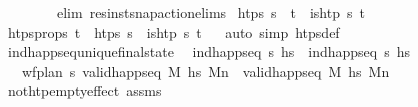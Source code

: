 \begin{isabellebody}
\ \ \ \ \ \ \ \ elim{\isacharbang}{\kern0pt}{\isacharcolon}{\kern0pt}\ res{\isacharunderscore}{\kern0pt}inst{\isacharunderscore}{\kern0pt}snap{\isacharunderscore}{\kern0pt}action{\isachardot}{\kern0pt}elims{\isacharparenright}{\kern0pt}\isanewline
{}\isamarkupfalse%
%
\endisatagproof
{\isafoldproof}%
%
\isadelimproof
\isanewline
%
\endisadelimproof
\isanewline
{}\isamarkupfalse%
\ {\isachardoublequoteopen}htps{\isacharprime}{\kern0pt}\ {\isasympi}s\ {\isasymequiv}\ {\isacharbraceleft}{\kern0pt}t\ {\isachardot}{\kern0pt}\ is{\isacharunderscore}{\kern0pt}htp\ {\isasympi}s\ t{\isacharbraceright}{\kern0pt}{\isachardoublequoteclose}\isanewline
\isanewline
{}\isamarkupfalse%
\ htps{\isacharunderscore}{\kern0pt}props{\isacharcolon}{\kern0pt}\ {\isachardoublequoteopen}t\ {\isasymin}\ htps{\isacharprime}{\kern0pt}\ {\isasympi}s\ {\isasymLongrightarrow}\ is{\isacharunderscore}{\kern0pt}htp\ {\isasympi}s\ t{\isachardoublequoteclose}\isanewline
%
\isadelimproof
\ \ %
\endisadelimproof
%
\isatagproof
{}\isamarkupfalse%
{\isacharparenleft}{\kern0pt}auto\ simp{\isacharcolon}{\kern0pt}\ htps{\isacharprime}{\kern0pt}{\isacharunderscore}{\kern0pt}def{\isacharparenright}{\kern0pt}%
\endisatagproof
{\isafoldproof}%
%
\isadelimproof
\isanewline
%
\endisadelimproof
\isanewline
{}\isamarkupfalse%
\ ind{\isacharunderscore}{\kern0pt}happ{\isacharunderscore}{\kern0pt}seq{\isacharunderscore}{\kern0pt}unique{\isacharunderscore}{\kern0pt}final{\isacharunderscore}{\kern0pt}state{\isacharprime}{\kern0pt}{\isacharcolon}{\kern0pt}\isanewline
\ \ ind{\isacharunderscore}{\kern0pt}happ{\isacharunderscore}{\kern0pt}seq\ {\isasympi}s\ hs{\isachardoublequoteclose}\ \ {\isachardoublequoteopen}ind{\isacharunderscore}{\kern0pt}happ{\isacharunderscore}{\kern0pt}seq\ {\isasympi}s\ hs{\isacharprime}{\kern0pt}{\isachardoublequoteclose}\isanewline
\ \ \ {\isachardoublequoteopen}{\isasymlbrakk}wf{\isacharunderscore}{\kern0pt}plan\ {\isasympi}s{\isacharsemicolon}{\kern0pt}\ valid{\isacharunderscore}{\kern0pt}happ{\isacharunderscore}{\kern0pt}seq\ M\ hs\ M\isactrlsub n{\isasymrbrakk}\ {\isasymLongrightarrow}\ valid{\isacharunderscore}{\kern0pt}happ{\isacharunderscore}{\kern0pt}seq\ M\ hs{\isacharprime}{\kern0pt}\ M\isactrlsub n{\isachardoublequoteclose}\isanewline
%
\isadelimproof
\ \ %
\endisadelimproof
%
\isatagproof
{}\isamarkupfalse%
\ not{\isacharunderscore}{\kern0pt}htp{\isacharunderscore}{\kern0pt}empty{\isacharunderscore}{\kern0pt}effect\ assms\isanewline

\end{isabellebody}
